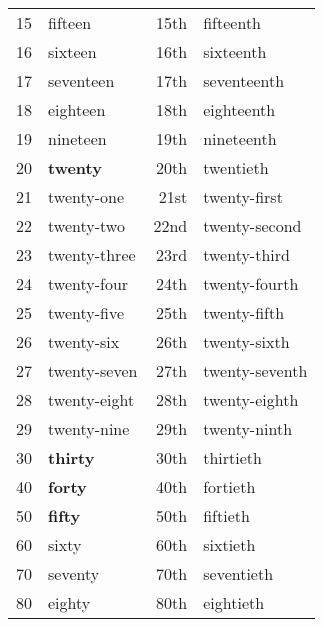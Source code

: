 \begin{table}[tp!]
\begin{tabular}[hp!]{rlrl}
    15        & fifteen                  & 15th        & fifteenth                  \\
    16        & sixteen                  & 16th        & sixteenth                  \\
    17        & seventeen                & 17th        & seventeenth                \\
    18        & eighteen                 & 18th        & eighteenth                 \\
    19        & nineteen                 & 19th        & nineteenth                 \\
    20        & \textbf{twenty}                & 20th        & twentieth                  \\
    21        & twenty-one               & 21st        & twenty-first               \\
    22        & twenty-two               & 22nd        & twenty-second              \\
    23        & twenty-three             & 23rd        & twenty-third               \\
    24        & twenty-four              & 24th        & twenty-fourth              \\
    25        & twenty-five              & 25th        & twenty-fifth               \\
    26        & twenty-six               & 26th        & twenty-sixth               \\
    27        & twenty-seven             & 27th        & twenty-seventh             \\
    28        & twenty-eight             & 28th        & twenty-eighth              \\
    29        & twenty-nine              & 29th        & twenty-ninth               \\
    30        & \textbf{thirty}                & 30th        & thirtieth                  \\
    40        & \textbf{forty}                 & 40th        & fortieth                   \\
    50        & \textbf{fifty}                 & 50th        & fiftieth                   \\
    60        & sixty                    & 60th        & sixtieth                   \\
    70        & seventy                  & 70th        & seventieth                 \\
    80        & eighty                   & 80th        & eightieth                  \\

\end{tabular}
\end{table}
